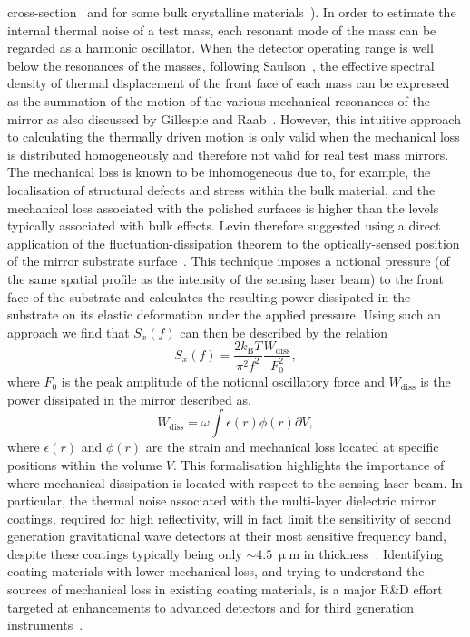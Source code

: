 \documentclass{article}
\begin{document}
cross-section~\cite{Nowick} and for some bulk crystalline
materials~\cite{Bragthermo}). In order to estimate the internal thermal noise of
a test mass, each resonant mode of the mass can be regarded as a harmonic
oscillator. When the detector operating range is well below the resonances of
the masses, following Saulson~\cite{Saulson2}, the effective spectral density of
thermal displacement of the front face of each mass can be expressed as the
summation of the motion of the various mechanical resonances of the mirror as
also discussed by Gillespie and Raab~\cite{Gillespie}. However, this intuitive
approach to calculating the thermally driven motion is only valid when the
mechanical loss is distributed homogeneously and therefore not valid for real
test mass mirrors. The mechanical loss is known to be inhomogeneous due to, for
example, the localisation of structural defects and stress within the bulk
material, and the mechanical loss associated with the polished surfaces is
higher than the levels typically associated with bulk effects.  Levin therefore
suggested using a direct application of the fluctuation-dissipation theorem to
the optically-sensed position of the mirror substrate surface~\cite{Levin}. 
This technique imposes a notional pressure (of the same spatial profile as the
intensity of the sensing laser beam) to the front face of the substrate and
calculates the resulting power dissipated in the substrate on its elastic
deformation under the applied pressure.  Using such an approach we find that
$S_x(f)$ can then be described by the relation
\begin{equation}
 S_x(f) = \frac{2k_\mathrm{B}T}{\pi^2 f^2} \frac{W_\mathrm{{diss}}}{F_0^2},
 \label{eqn:S-x_Levin}
\end{equation}
where $F_0$ is the peak amplitude of the notional oscillatory force and 
$W_\mathrm{{diss}}$ is the power dissipated in the mirror described as,
\begin{equation}
 W_\mathrm{{diss}} = \omega \int{\epsilon(r)\phi(r)\partial V},
 \label{eqn:S-x_Levin2}
\end{equation}
where $\epsilon(r)$ and $\phi(r)$ are the strain and mechanical loss located at
specific positions within the volume $V$. This formalisation highlights the
importance of where mechanical dissipation is located with respect to the
sensing laser beam.  In particular, the thermal noise associated with the
multi-layer dielectric mirror coatings, required for high reflectivity, will in
fact limit the sensitivity of second generation gravitational wave detectors at
their most sensitive frequency band, despite these coatings typically being only
$\sim 4.5~\upmu \textrm{m}$ in thickness~\cite{Harry:2002}. Identifying coating
materials with lower mechanical loss, and trying to understand the sources of
mechanical loss in existing coating materials, is a major R\&D  effort targeted
at enhancements to advanced detectors and for third generation
instruments~\cite{Martin:2008}.
\end{document}
